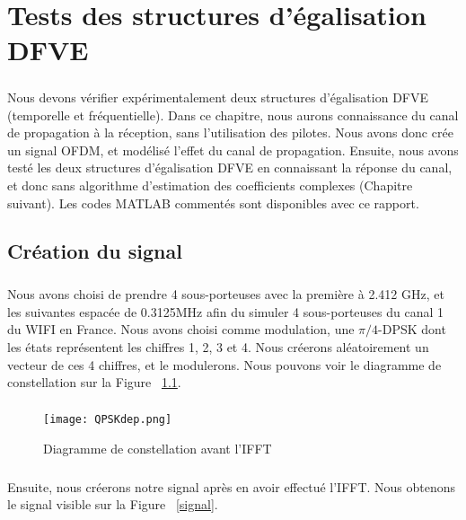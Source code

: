 \chapter{Tests des structures d'égalisation DFVE}

\paragraph{}
Nous devons vérifier expérimentalement deux structures d'égalisation DFVE
(temporelle et fréquentielle). Dans ce chapitre, nous aurons connaissance du
canal de propagation à la réception, sans l'utilisation des pilotes. Nous avons
donc crée un signal OFDM, et modélisé l'effet du canal de propagation. Ensuite,
nous avons testé les deux structures d'égalisation DFVE en connaissant la
réponse du canal, et donc sans algorithme d'estimation des coefficients
complexes (Chapitre suivant). Les codes MATLAB commentés sont disponibles avec ce
rapport.

\section{Création du signal}

\paragraph{}
Nous avons choisi de prendre 4 sous-porteuses avec la première à 2.412 GHz, et
les suivantes espacée de 0.3125MHz afin du simuler 4 sous-porteuses du canal 1
du WIFI en France. Nous avons choisi comme modulation, une $\pi/4$-DPSK dont les
états représentent les chiffres 1, 2, 3 et 4. Nous créerons aléatoirement
un vecteur de ces 4 chiffres, et le modulerons. Nous pouvons voir le diagramme de
constellation sur la Figure ~\ref{QPSK}.

\paragraph{}
\vspace{1\baselineskip}
\begin{figure}[!h]
  \centering
  \texttt{[image: QPSKdep.png]}
  \caption{Diagramme de constellation avant l'IFFT }
	\label{QPSK}
\end{figure}
\vspace{10\baselineskip}

\paragraph{}
Ensuite, nous créerons notre signal après en avoir effectué l'IFFT. Nous obtenons le signal visible sur la Figure ~\ref{signal}.

